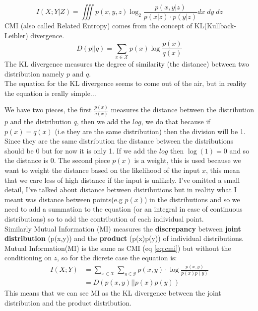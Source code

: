 \begin{equation}
    I(X;Y|Z)=\iiint{p(x,y,z)\log_2{\frac{p(x, y| z)}{p(x|z)\cdot p(y|z)}}dx\;dy\;dz}
    \label{eq:cmi}
\end{equation}
CMI (also called Related Entropy) comes from the concept of KL(Kullback-Leibler) divergence.
\begin{equation}
    D(p||q)=\sum_{x\in\mathcal{X}}p(x)\log{\frac{p(x)}{q(x)}}
\end{equation}
The KL divergence measures the degree of similarity (the distance) between two distribution namely $p$ and $q$.\\

The equation for the KL divergence seems to come out of the air, but in reality the equation is really simple...

We have two pieces, the first $\frac{p(x)}{q(x)}$ measures the distance between 
the distribution $p$ and the distribution $q$, then we add the $log$, we do that 
because if $p(x)=q(x)$ (i.e they are the same distribution) then the division will 
be 1. Since they are the same distribution the distance between the distributions should be 0 but for now it is only 1. 
If we add the $log$ then $\log(1)=0$ and so the distance is 0. The second piece $p(x)$ is a weight, this 
is used because we want to weight the distance based on the likelihood of the input
 $x$, this mean that we care less of high distance if the input is unlikely.
I've omitted a small detail, I've talked about distance between distributions 
but in reality what I meant was distance between points(e.g $p(x)$) in the 
distributions and so we need to add a summation to the equation 
(or an integral in case of continuous distributions) so to add the contribution
 of each individual point.\\

Similarly Mutual Information (MI) measures the \textbf{discrepancy} between \textbf{joint distribution} (p(x,y)) and the \textbf{product} (p(x)p(y)) of individual distributions.
Mutual Information(MI) is the same as CMI (eq \ref{eq:cmi}) but without the conditioning on $z$, so for the dicrete case the equation is:
\begin{equation}\label{eq:mi_disc}
    \begin{split}
        I(X;Y)&=\sum_{x\in\mathcal{X}}\sum_{y\in\mathcal{Y}}p(x,y)\cdot\log{\frac{p(x,y)}{p(x)p(y)}}\\
        &=D(p(x,y)||p(x)p(y))
    \end{split}
\end{equation}
This means that we can see MI as the KL divergence between the joint distribution and the product distribution.

